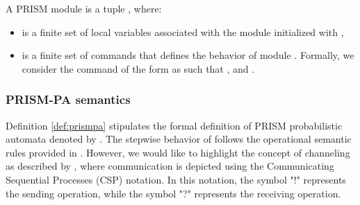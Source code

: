 \begin{mydef} \label{def:prismmodule} \normalfont A PRISM module  is a tuple , where: 
 \begin{itemize}
\item {} is a finite set of local variables associated with the module  initialized with ,
\item {} is a finite set of commands that defines the behavior of module . Formally, we consider the command of the form  as  such that ,  and . 
            \end{itemize}
\end{mydef}


\subsubsection{PRISM-PA semantics}
Definition \ref{def:prismpa}  stipulates the formal definition of PRISM probabilistic automata denoted by  . The stepwise behavior of  follows the operational semantic rules provided in . However, we would like to highlight the concept of channeling as described by \cite{baierprinciples2008} , where communication is depicted using the Communicating Sequential Processes (CSP) notation. In this notation, the symbol "!" represents the sending operation, while the symbol "?" represents the receiving operation.


